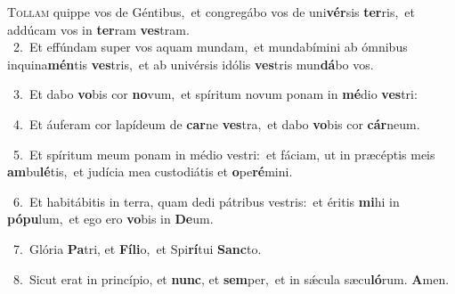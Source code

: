 \lettrine{\initial\textcolor{\initialcolor}{T}}{ollam} quippe vos de Géntibus,~\dagger et congregábo vos de uni\-\textbf{vér}\-sis \textbf{ter}\-ris,~\star et addúcam vos in \textbf{ter}\-ram \textbf{ves}\-tram.\\
{\numbfont\textcolor{\numbcolor}{~2.}}~Et effúndam super vos aquam mundam,~\dagger et mundabímini ab ómnibus inquina\-\textbf{mén}\-tis \textbf{ves}\-tris,~\star et ab univérsis idólis \textbf{ves}\-tris mun\-\textbf{dá}\-bo vos.\par
{\numbfont\textcolor{\numbcolor}{~3.}}~Et dabo \textbf{vo}\-bis cor \textbf{no}\-vum,~\star et spíritum novum ponam in \textbf{mé}\-dio \textbf{ves}\-tri:\par
{\numbfont\textcolor{\numbcolor}{~4.}}~Et áuferam cor lapídeum de \textbf{car}\-ne \textbf{ves}\-tra,~\star et dabo \textbf{vo}\-bis cor \textbf{cár}\-neum.\par
{\numbfont\textcolor{\numbcolor}{~5.}}~Et spíritum meum ponam in médio vestri:~\dagger et fáciam, ut in præcéptis meis \textbf{am}\-bu\-\textbf{lé}\-tis,~\star et judícia mea custodiátis et \textbf{o}\-pe\-\textbf{ré}\-mini.\par
{\numbfont\textcolor{\numbcolor}{~6.}}~Et habitábitis in terra, quam dedi pátribus vestris:~\dagger et éritis \textbf{mi}\-hi in \textbf{pó}\-\textbf{pu}lum,~\star et ego ero \textbf{vo}\-bis in \textbf{De}\-um.\par
{\numbfont\textcolor{\numbcolor}{~7.}}~Glória \textbf{Pa}\-tri, et \textbf{Fí}\-\textbf{li}o,~\star et Spi\-\textbf{rí}\-tui \textbf{Sanc}\-to.\par
{\numbfont\textcolor{\numbcolor}{~8.}}~Sicut erat in princípio, et \textbf{nunc}\-, et \textbf{sem}\-per,~\star et in sǽcula sæcu\-\textbf{ló}\-rum. \textbf{A}\-men.\par
